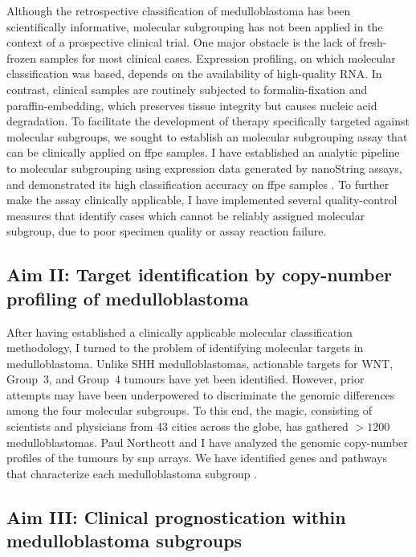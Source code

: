 Although the retrospective classification of medulloblastoma has been scientifically informative, molecular subgrouping has not been applied in the context of a prospective clinical trial. One major obstacle is the lack of fresh-frozen samples for most clinical cases. Expression profiling, on which molecular classification was based, depends on the availability of high-quality RNA. In contrast, clinical samples are routinely subjected to formalin-fixation and paraffin-embedding, which preserves tissue integrity but causes nucleic acid degradation. To facilitate the development of therapy specifically targeted against molecular subgroups, we sought to establish an molecular subgrouping assay that can be clinically applied on \gls{ffpe} samples. I have established an analytic pipeline to molecular subgrouping using expression data generated by nanoString assays, and demonstrated its high classification accuracy on \gls{ffpe} samples . To further make the assay clinically applicable, I have implemented several quality-control measures that identify cases which cannot be reliably assigned molecular subgroup, due to poor specimen quality or assay reaction failure.

\subsection*{Aim II: Target identification by copy-number profiling of medulloblastoma}

After having established a clinically applicable molecular classification methodology, I turned to the problem of identifying molecular targets in medulloblastoma. Unlike SHH medulloblastomas, actionable targets for WNT, Group~3, and Group~4 tumours have yet been identified. However, prior attempts may have been underpowered to discriminate the genomic differences among the four molecular subgroups. To this end, the \gls{magic}, consisting of scientists and physicians from 43 cities across the globe, has gathered $>1200$ medulloblastomas. Paul Northcott and I have analyzed the genomic copy-number profiles of the tumours by \gls{snp} arrays. We have identified genes and pathways that characterize each medulloblastoma subgroup .


\subsection*{Aim III: Clinical prognostication within medulloblastoma subgroups}

